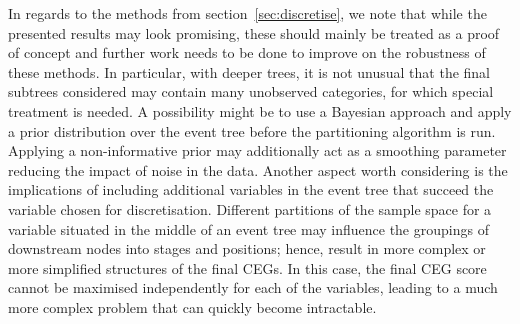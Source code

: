 \documentclass[runningheads]{llncs}
\begin{document}
In regards to the methods from section~\ref{sec:discretise}, we note that while the presented results may look promising, these should mainly be treated as a proof of concept and further work needs to be done to improve on the robustness of these methods. In particular, with deeper trees, it is not unusual that the final subtrees considered may contain many unobserved categories, for which special treatment is needed. A possibility might be to use a Bayesian approach and apply a prior distribution over the event tree before the partitioning algorithm is run. Applying a non-informative prior may additionally act as a smoothing parameter reducing the impact of noise in the data. Another aspect worth considering is the implications of including additional variables in the event tree that succeed the variable chosen for discretisation. Different partitions of the sample space for a variable situated in the middle of an event tree may influence the groupings of downstream nodes into stages and positions; hence, result in more complex or more simplified structures of the final CEGs. In this case, the final CEG score cannot be maximised independently for each of the variables, leading to a much more complex problem that can quickly become intractable. 


\appendix
\newpage
\end{document}
